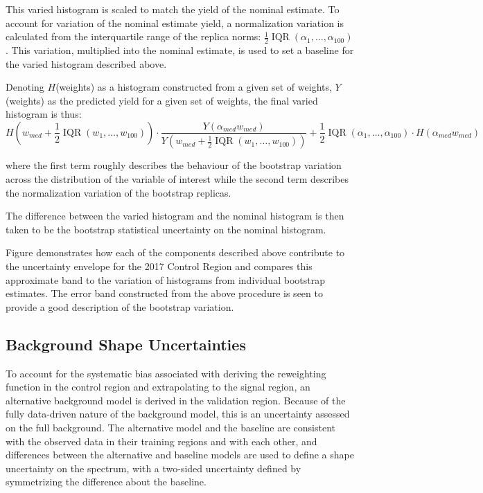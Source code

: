 This varied histogram is scaled to match the yield of the nominal estimate. To account for variation of the 
nominal estimate yield, a normalization variation is calculated from the interquartile range of the replica norms:
$\frac{1}{2}\operatorname{IQR}(\alpha_{1}, \ldots, \alpha_{100})$. This variation, multiplied into the nominal
estimate, is used to set a baseline for the varied histogram described above.

Denoting $H$(weights) as a histogram constructed from a given set of weights, $Y$(weights) as the predicted yield
for a given set of weights, the final varied histogram is thus:
\begin{equation}
H(w_{med} +\frac{1}{2}\operatorname{IQR}(w_{1},\ldots, w_{100}))\cdot \frac{Y(\alpha_{med}w_{med})}{Y(w_{med} +\frac{1}{2}\operatorname{IQR}(w_{1},\ldots, w_{100}))} + \frac{1}{2}\operatorname{IQR}(\alpha_{1}, \ldots, \alpha_{100})\cdot H(\alpha_{med}w_{med})
\end{equation}

where the first term roughly describes the behaviour of the bootstrap variation across the distribution of 
the variable of interest while the second term describes the normalization variation of the bootstrap replicas.

The difference between the varied histogram and the nominal histogram is then
taken to be the bootstrap statistical uncertainty on the nominal histogram.

Figure  demonstrates how each of the components described above
contribute to the uncertainty envelope for the 2017 Control Region 
and compares this approximate band to the variation of histograms from individual bootstrap 
estimates. The error band constructed from the above procedure is seen to provide a good 
description of the bootstrap variation.

\subsection{Background Shape Uncertainties}
To account for the systematic bias associated with deriving the reweighting function
in the control region and extrapolating to the signal region, an alternative background
model is derived in the validation region. Because of the fully data-driven nature of the 
background model, this is an uncertainty assessed on the full background. The alternative model 
and the baseline are consistent with the observed data in their training regions and with each other, and 
differences between the alternative and baseline models are used to define a shape uncertainty on the \mhh
spectrum, with a two-sided uncertainty defined by symmetrizing the difference about
the baseline.

